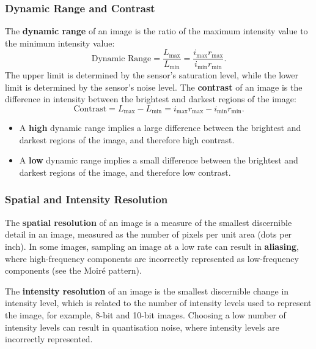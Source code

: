 \documentclass{article}
\begin{document}
\subsubsection{Dynamic Range and Contrast}
The \textbf{dynamic range} of an image is the ratio of the maximum
intensity value to the minimum intensity value:
\begin{equation*}
    \text{Dynamic Range} = \frac{L_{\text{max}}}{L_{\text{min}}} = \frac{i_{\text{max}} r_{\text{max}}}{i_{\text{min}} r_{\text{min}}}.
\end{equation*}
The upper limit is determined by the sensor's saturation level, while
the lower limit is determined by the sensor's noise level. The
\textbf{contrast} of an image is the difference in intensity between the
brightest and darkest regions of the image:
\begin{equation*}
    \text{Contrast} = L_{\text{max}} - L_{\text{min}} = i_{\text{max}} r_{\text{max}} - i_{\text{min}} r_{\text{min}}.
\end{equation*}
\begin{itemize}
    \item A \textbf{high} dynamic range implies a large difference
          between the brightest and darkest regions of the image, and
          therefore high contrast.
    \item A \textbf{low} dynamic range implies a small difference
          between the brightest and darkest regions of the image, and
          therefore low contrast.
\end{itemize}
\subsubsection{Spatial and Intensity Resolution}
The \textbf{spatial resolution} of an image is a measure of the
smallest discernible detail in an image, measured as the number of
pixels per unit area (dots per inch). In some images, sampling an image
at a low rate can result in \textbf{aliasing}, where high-frequency
components are incorrectly represented as low-frequency components (see
the Moiré pattern).

The \textbf{intensity resolution} of an image is the smallest
discernible change in intensity level, which is related to the number
of intensity levels used to represent the image, for example, 8-bit and
10-bit images. Choosing a low number of intensity levels can result in
quantisation noise, where intensity levels are incorrectly represented.
\end{document}
